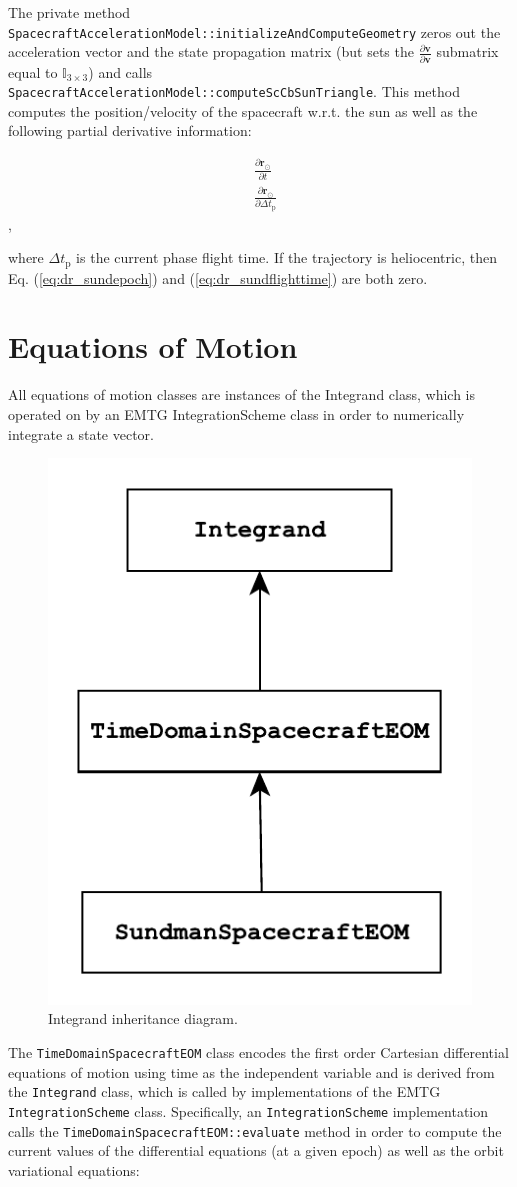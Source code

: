 The private method \texttt{SpacecraftAccelerationModel::initializeAndComputeGeometry} zeros out the acceleration vector and the state propagation matrix (but sets the $\frac{\partial \mathbf{v}}{\partial \mathbf{v}}$ submatrix equal to $\mathbb{I}_{3\times3}$) and calls \texttt{SpacecraftAccelerationModel::computeScCbSunTriangle}. This method computes the position/velocity of the spacecraft w.r.t. the sun as well as the following partial derivative information:

\begin{align}
    &\frac{\partial \mathbf{r}_{\odot}}{\partial t} \label{eq:dr_sundepoch} \\
    &\frac{\partial \mathbf{r}_{\odot}}{\partial \Delta t_{\text{p}}} \label{eq:dr_sundflighttime}
\end{align},

\noindent where $\Delta t_{\text{p}}$ is the current phase flight time. If the trajectory is heliocentric, then Eq. (\ref{eq:dr_sundepoch}) and (\ref{eq:dr_sundflighttime}) are both zero.






\section{Equations of Motion}
\label{sec:Equations of Motion}

All equations of motion classes are instances of the Integrand class, which is operated on by an EMTG IntegrationScheme class in order to numerically integrate a state vector.

\begin{figure}[h!]
    \centering
    \includegraphics[width=0.3\linewidth]{./astrodynamics/Integrand_EOM_inheritance.pdf}
    \caption{\label{fig:Integrand_EOM_inheritance} Integrand inheritance diagram.}
\end{figure}

The \texttt{TimeDomainSpacecraftEOM} class encodes the first order Cartesian differential equations of motion using time as the independent variable and is derived from the \texttt{Integrand} class, which is called by implementations of the EMTG \texttt{IntegrationScheme} class. Specifically, an \texttt{IntegrationScheme} implementation calls the \texttt{TimeDomainSpacecraftEOM::evaluate} method in order to compute the current values of the differential equations (at a given epoch) as well as the orbit variational equations:

